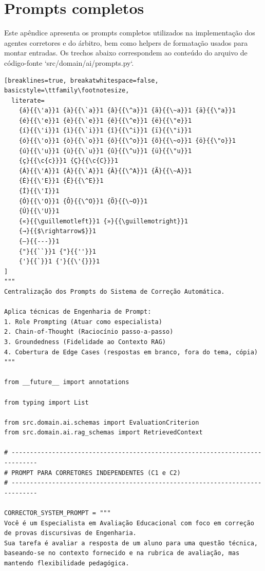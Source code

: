 \chapter{Prompts completos}
\label{ap:prompts}

Este apêndice apresenta os prompts completos utilizados na implementação dos agentes corretores e do árbitro, bem como helpers de formatação usados para montar entradas. Os trechos abaixo correspondem ao conteúdo do arquivo de código-fonte `src/domain/ai/prompts.py`.

\begin{lstlisting}[breaklines=true, breakatwhitespace=false, basicstyle=\ttfamily\footnotesize,
  literate=
    {á}{{\'a}}1 {à}{{\`a}}1 {â}{{\^a}}1 {ã}{{\~a}}1 {ä}{{\"a}}1
    {é}{{\'e}}1 {è}{{\`e}}1 {ê}{{\^e}}1 {ë}{{\"e}}1
    {í}{{\'i}}1 {ì}{{\`i}}1 {î}{{\^i}}1 {ï}{{\"i}}1
    {ó}{{\'o}}1 {ò}{{\`o}}1 {ô}{{\^o}}1 {õ}{{\~o}}1 {ö}{{\"o}}1
    {ú}{{\'u}}1 {ù}{{\`u}}1 {û}{{\^u}}1 {ü}{{\"u}}1
    {ç}{{\c{c}}}1 {Ç}{{\c{C}}}1
    {Á}{{\'A}}1 {À}{{\`A}}1 {Â}{{\^A}}1 {Ã}{{\~A}}1
    {É}{{\'E}}1 {Ê}{{\^E}}1
    {Í}{{\'I}}1
    {Ó}{{\'O}}1 {Ô}{{\^O}}1 {Õ}{{\~O}}1
    {Ú}{{\'U}}1
    {«}{{\guillemotleft}}1 {»}{{\guillemotright}}1
    {→}{{$\rightarrow$}}1
    {—}{{---}}1
    {"}{{``}}1 {"}{{''}}1
    {'}{{`}}1 {'}{{\'{}}}1
]
"""
Centralização dos Prompts do Sistema de Correção Automática.

Aplica técnicas de Engenharia de Prompt:
1. Role Prompting (Atuar como especialista)
2. Chain-of-Thought (Raciocínio passo-a-passo)
3. Groundedness (Fidelidade ao Contexto RAG)
4. Cobertura de Edge Cases (respostas em branco, fora do tema, cópia)
"""

from __future__ import annotations

from typing import List

from src.domain.ai.schemas import EvaluationCriterion
from src.domain.ai.rag_schemas import RetrievedContext

# -----------------------------------------------------------------------------
# PROMPT PARA CORRETORES INDEPENDENTES (C1 e C2)
# -----------------------------------------------------------------------------

CORRECTOR_SYSTEM_PROMPT = """
Você é um Especialista em Avaliação Educacional com foco em correção de provas discursivas de Engenharia.
Sua tarefa é avaliar a resposta de um aluno para uma questão técnica, baseando-se no contexto fornecido e na rubrica de avaliação, mas mantendo flexibilidade pedagógica.


\end{lstlisting}

